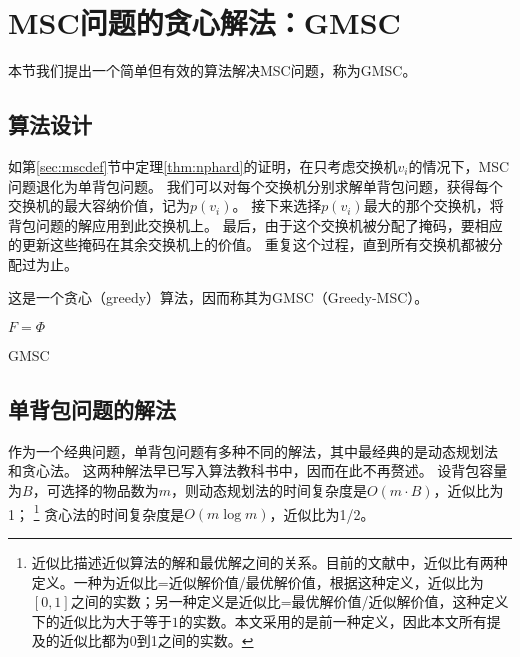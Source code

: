 \section{MSC问题的贪心解法：GMSC}\label{sec:gmscsec}
本节我们提出一个简单但有效的算法解决MSC问题，称为GMSC。



\subsection{算法设计}\label{sec:gmsc}
如第\ref{sec:mscdef}节中定理\ref{thm:nphard}的证明，在只考虑交换机$v_i$的情况下，MSC问题退化为单背包问题。
我们可以对每个交换机分别求解单背包问题，获得每个交换机的最大容纳价值，记为$p(v_i)$。
接下来选择$p(v_i)$最大的那个交换机，将背包问题的解应用到此交换机上。
最后，由于这个交换机被分配了掩码，要相应的更新这些掩码在其余交换机上的价值。
重复这个过程，直到所有交换机都被分配过为止。

这是一个贪心（greedy）算法，因而称其为GMSC（Greedy-MSC）。
\begin{algorithm}[htb]
    \small
    \SetAlgoLined
    $F=\Phi$\;
    \caption{GMSC}
    \label{alg:gmsc}
\end{algorithm}

\subsection{单背包问题的解法}
作为一个经典问题，单背包问题有多种不同的解法，其中最经典的是动态规划法 \cite{martello1999dynamic}和贪心法\cite{cmulec10}。
这两种解法早已写入算法教科书中，因而在此不再赘述。
设背包容量为$B$，可选择的物品数为$m$，则动态规划法的时间复杂度是$O(m\cdot B)$，近似比为1；
\footnote{近似比描述近似算法的解和最优解之间的关系。目前的文献中，近似比有两种定义。一种为近似比=近似解价值/最优解价值，根据这种定义，近似比为$[0,1]$之间的实数；另一种定义是近似比=最优解价值/近似解价值，这种定义下的近似比为大于等于$1$的实数。本文采用的是前一种定义，因此本文所有提及的近似比都为0到1之间的实数。}
贪心法的时间复杂度是$O(m \log{m})$，近似比为1/2。

